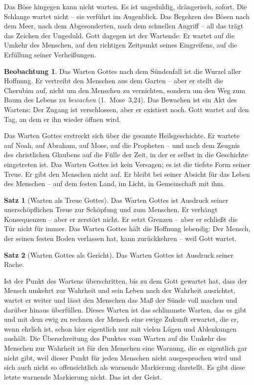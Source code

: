 ﻿\documentclass[a4paper,12pt]{article}
\theoremstyle{definition}
\newtheorem{theorem}{Satz}[section]
\newtheorem{observation}{Beobachtung}[section]
\begin{document}
Das Böse hingegen kann nicht warten. Es ist ungeduldig, drängerisch, sofort. Die
Schlange wartet nicht -- sie verführt im Augenblick. Das Begehren des Bösen nach
dem Meer, nach dem Abgesonderten, nach dem schnellen Angriff -- all das trägt das
Zeichen der Ungeduld. Gott dagegen ist der Wartende: Er wartet auf die Umkehr des
Menschen, auf den richtigen Zeitpunkt seines Eingreifens, auf die Erfüllung seiner
Verheißungen.

\begin{observation}
	Das Warten Gottes nach dem Sündenfall ist die Wurzel aller Hoffnung. Er
	vertreibt den Menschen aus dem Garten -- aber er stellt die Cherubim auf, nicht
	um den Menschen zu vernichten, sondern um den Weg zum Baum des Lebens zu
	\textit{bewachen} (1.~Mose~3,24). Das Bewachen ist ein Akt des Wartens: Der
	Zugang ist verschlossen, aber er existiert noch. Gott wartet auf den Tag, an
	dem er ihn wieder öffnen wird.
\end{observation}

Das Warten Gottes erstreckt sich über die gesamte Heilsgeschichte. Er wartete auf
Noah, auf Abraham, auf Mose, auf die Propheten -- und nach dem Zeugnis des
christlichen Glaubens auf die Fülle der Zeit, in der er selbst in die Geschichte
eingetreten ist. Das Warten Gottes ist kein Versagen; es ist die tiefste Form
seiner Treue. Er gibt den Menschen nicht auf. Er bleibt bei seiner Absicht für
das Leben des Menschen -- auf dem festen Land, im Licht, in Gemeinschaft mit ihm.

\begin{theorem}[Warten als Treue Gottes]
	Das Warten Gottes ist Ausdruck seiner unerschöpflichen Treue zur Schöpfung
	und zum Menschen. Er verhängt Konsequenzen -- aber er zerstört nicht. Er setzt
	Grenzen -- aber er schließt die Tür nicht für immer. Das Warten Gottes hält
	die Hoffnung lebendig: Der Mensch, der seinen festen Boden verlassen hat, kann
	zurückkehren -- weil Gott wartet.
\end{theorem}


\begin{theorem}[Warten Gottes als Gericht]
	Das Warten Gottes ist Ausdruck seiner Rache.
\end{theorem}

Ist der Punkt des Wartens überschritten, bis zu dem Gott gewartet hat, dass der Mensch umkehrt zur Wahrheit und sein Leben nach der Wahrheit ausrichtet, wartet er weiter und lässt den Menschen das Maß der Sünde voll machen und darüber hinaus überfüllen. Dieses Warten ist das schlimmste Warten, das es gibt und mit dem ewig zu rechnen der Mensch eine ewige Zukunft erwartet, die er, wenn ehrlich ist, schon hier eigentlich nur mit vielen Lügen und Ablenkungen aushält. Die Überschreitung des Punktes vom Warten auf die Umkehr des Menschen zur Wahrheit ist für den Menschen eine Warnung, die es eigentlich gar nicht gibt, weil dieser Punkt für jeden Menschen nicht ausgesprochen wird und sich auch nicht so offensichtlich als warnende Markierung darstellt. Es gibt diese letzte warnende Markierung nicht. Das ist der Geist.
\end{document}
